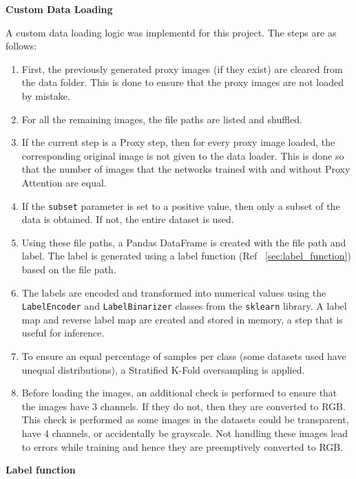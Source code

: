 \textbf{Custom Data Loading}

A custom data loading logic was implementd for this project. The steps are as follows:
\begin{enumerate}
    \item First, the previously generated proxy images (if they exist) are cleared from the data folder. This is done to ensure that the proxy images are not loaded by mistake.
    \item For all the remaining images, the file paths are listed and shuffled.
    \item If the current step is a Proxy step, then for every proxy image loaded, the corresponding original image is not given to the data loader. This is done so that the number of images that the networks trained with and without Proxy Attention are equal.
    \item If the \lstinline[language=Python]{subset} parameter is set to a positive value, then only a subset of the data is obtained. If not, the entire dataset is used.
    \item Using these file paths, a Pandas DataFrame is created with the file path and label. The label is generated using a label function (Ref ~\ref{sec:label_function}) based on the file path.
    \item The labels are encoded and transformed into numerical values using the \lstinline[language=Python]{LabelEncoder} and \lstinline[language=Python]{LabelBinarizer} classes from the \lstinline[language=Python]{sklearn} library. A label map and reverse label map are created and stored in memory, a step that is useful for inference.
    \item To ensure an equal percentage of samples per class (some datasets used have unequal distributions), a Stratified K-Fold oversampling is applied.
    \item Before loading the images, an additional check is performed to ensure that the images have 3 channels. If they do not, then they are converted to RGB. This check is performed as some images in the datasets could be transparent, have 4 channels, or accidentally be grayscale. Not handling these images lead to errors while training and hence they are preemptively converted to RGB.
\end{enumerate}

\textbf{Label function} \label{sec:label_function}

